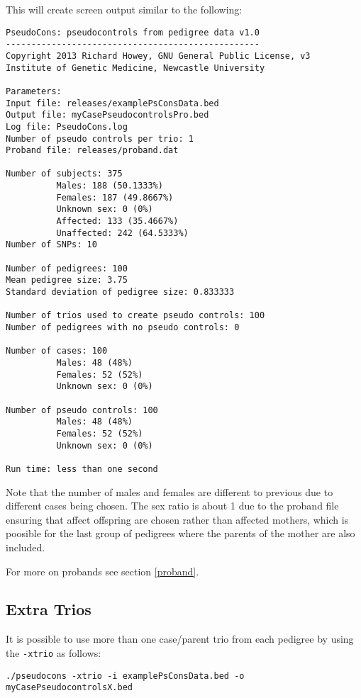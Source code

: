 \documentclass[a4paper,12pt]{article}
\newcommand{\code}[1]{{\footnotesize{{\tt #1}}}}
\begin{document}
This will create screen output similar to the following: 
\begin{verbatim}
PseudoCons: pseudocontrols from pedigree data v1.0
--------------------------------------------------
Copyright 2013 Richard Howey, GNU General Public License, v3
Institute of Genetic Medicine, Newcastle University

Parameters:
Input file: releases/examplePsConsData.bed
Output file: myCasePseudocontrolsPro.bed
Log file: PseudoCons.log
Number of pseudo controls per trio: 1
Proband file: releases/proband.dat

Number of subjects: 375
          Males: 188 (50.1333%)
          Females: 187 (49.8667%)
          Unknown sex: 0 (0%)
          Affected: 133 (35.4667%)
          Unaffected: 242 (64.5333%)
Number of SNPs: 10

Number of pedigrees: 100
Mean pedigree size: 3.75
Standard deviation of pedigree size: 0.833333

Number of trios used to create pseudo controls: 100
Number of pedigrees with no pseudo controls: 0

Number of cases: 100
          Males: 48 (48%)
          Females: 52 (52%)
          Unknown sex: 0 (0%)

Number of pseudo controls: 100
          Males: 48 (48%)
          Females: 52 (52%)
          Unknown sex: 0 (0%)

Run time: less than one second
\end{verbatim}

Note that the number of males and females are different to previous due to different cases being chosen. The sex ratio is about 1 due to the proband file ensuring that affect offspring are chosen rather than affected mothers, which is poosible for the last group of pedigrees where the parents of the mother are also included. 

For more on probands see  section \ref{proband}. 


\subsection{Extra Trios}
\label{eg-extratrios}

It is possible to use more than one case/parent trio from each pedigree by using the \code{-xtrio} as follows: 
\begin{verbatim}
./pseudocons -xtrio -i examplePsConsData.bed -o myCasePseudocontrolsX.bed
\end{verbatim}
\end{document}
